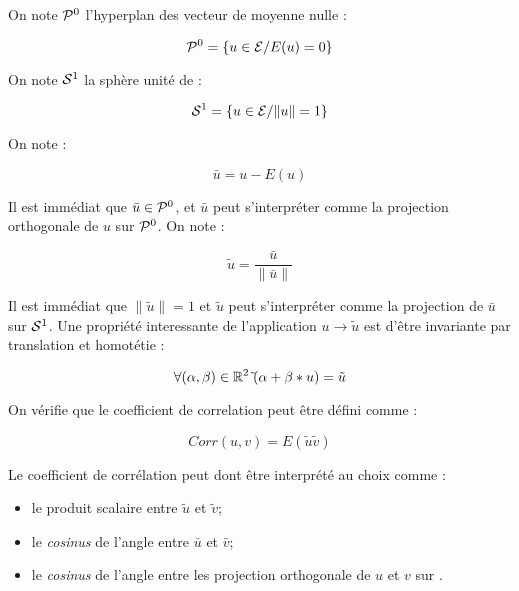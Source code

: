 On note $\PZero$ l'hyperplan des vecteur de moyenne nulle :

\begin{equation}
   \PZero = \{u\in \Echant / E(u)=0\}
\end{equation}

On note $\SUn$ la sph\`ere unit\'e de \Echant :

\begin{equation}
   \SUn = \{u\in \Echant / \|u\|=1 \}
\end{equation}

On note :

\begin{equation}
   \bar{u} = u -E(u)
\end{equation}

Il est imm\'ediat que $\bar{u} \in \PZero$, et $\bar{u}$ peut s'interpr\'eter
comme  la projection orthogonale de $u$ sur $\PZero$. On note :

\begin{equation}
   \tilde{u} = \frac{\bar{u}}{\| \bar{u} \|}
\end{equation}


Il est imm\'ediat que $\|\tilde{u}\|=1$ et $\tilde{u}$ peut s'interpr\'eter
comme la projection de $\bar{u}$ sur $\SUn$. Une propri\'et\'e interessante
de  l'application $u \rightarrow \tilde{u} $ est d'\^etre invariante  par
translation et homot\'etie :

\begin{equation}
  \forall  (\alpha,\beta) \in \RR^2 \; \tilde{}(\alpha+\beta*u) = \tilde{u}
\end{equation}

On v\'erifie  que le coefficient de correlation peut \^etre d\'efini comme :

\begin{equation}
   Corr(u,v) =  E(\tilde{u}\tilde{v})
   \label{Cor:Prod:Scal}
\end{equation}


Le coefficient de corr\'elation peut dont \^etre interpr\'et\'e
au choix comme :

\begin{itemize}
  \item  le produit scalaire entre $\tilde{u}$ et $\tilde{v}$;

  \item  le \emph{cosinus} de l'angle entre $\bar{u}$ et $\bar{v}$;

  \item  le \emph{cosinus} de l'angle entre les projection orthogonale
         de $u$ et $v$ sur \PZero.
\end{itemize}


